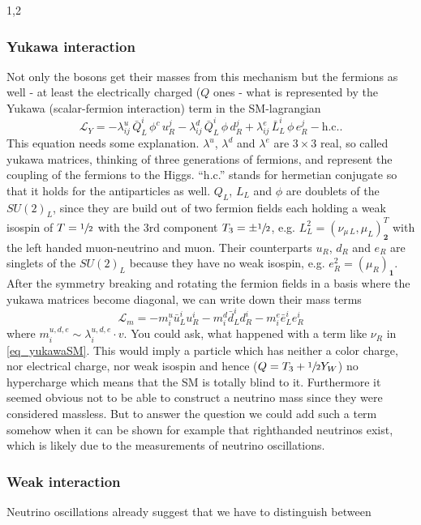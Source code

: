 \documentclass[11pt,a4paper,twoside]{article}
\begin{document}
\begin{spacing}{1,2}
\subsubsection*{Yukawa interaction}
Not only the bosons get their masses from this mechanism but the fermions as well - at least the electrically charged ($Q$ ones - what is represented by the
Yukawa (scalar-fermion interaction) term in the SM-lagrangian
\begin{equation}
 \mathcal{L}_{Y} = - \lambda^u_{ij}\, \bar Q^i_L \, \phi^c\, u^j_R - \lambda^d_{ij}\, \bar Q^i_L\, \phi\, d^j_R + \lambda^e_{ij}\, \bar L^i_L\, \phi\, e^j_R - \text{h.c.}.
 \label{eq_yukawaSM}
\end{equation}
\noindent
This equation needs some explanation. $\lambda^u$, $\lambda^d$ and $\lambda^e$ are $3\times 3$ real, so called yukawa matrices, thinking of three generations of fermions, and represent the 
coupling of the fermions to the Higgs. ``h.c.'' stands for hermetian conjugate so that it holds for the antiparticles as well. 
$Q_L$, $L_L$ and $\phi$ are doublets of the $SU(2)_L$, since they are build out of two fermion fields each holding a 
weak isospin of $T=\sfrac12$ with the 3rd component $T_3 = \pm\sfrac12$, e.g. $L^2_L = (\nu_{\mu\, L}, \mu_L)^T_{\textbf{2}}$ with the left handed muon-neutrino and muon. 
Their counterparts $u_R$, $d_R$ and $e_R$ are singlets of the $SU(2)_L$ because they have no weak isospin, e.g. $e^2_R = (\mu_R)_{\textbf{1}}$. After 
the symmetry breaking and rotating the fermion fields in a basis where the yukawa matrices become diagonal, we can write down their mass terms 
\begin{equation}
 \mathcal{L}_m = -m^u_i \bar u^i_L u^i_R -m^d_i \bar d^i_L d^i_R -m^e_i \bar e^i_L e^i_R 
\end{equation}
\noindent
where $m^{u,d,e}_i \sim \lambda^{u,d,e}_i \cdot v$. You could ask,
what happened with a term like $\nu_R$ in \eqref{eq_yukawaSM}. This would imply a particle which has neither a color charge, nor electrical charge, nor 
weak isospin and hence ($Q = T_3 + \sfrac12 Y_W$) no hypercharge which means that the SM is totally blind to it. Furthermore it seemed obvious not to be
able to construct a neutrino mass since they were considered massless. But to answer the question we could add 
such a term somehow when it can be shown for example that righthanded neutrinos exist, which is likely due to the measurements of neutrino oscillations.

\subsubsection*{Weak interaction}
Neutrino oscillations already suggest that we have to distinguish between 


\end{spacing}
\end{document}
